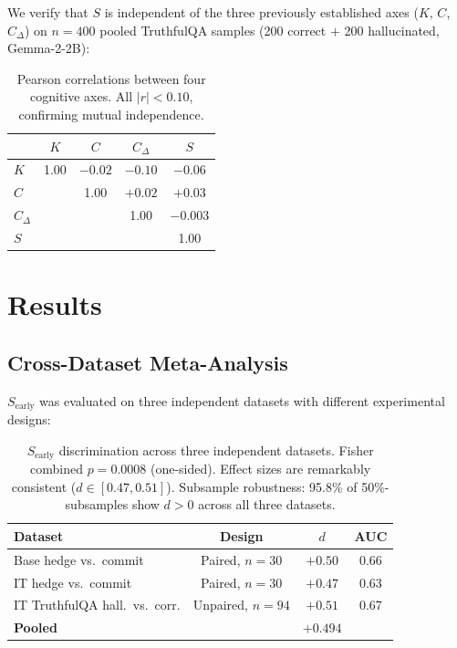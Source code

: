 \documentclass{article}
\begin{document}
We verify that $S$ is independent of the three previously established
axes ($K$, $C$, $C_\Delta$) on $n = 400$ pooled TruthfulQA samples
(200 correct $+$ 200 hallucinated, Gemma-2-2B):

\begin{table}[h]
\centering
\small
\begin{tabular}{lcccc}
\toprule
 & $K$ & $C$ & $C_\Delta$ & $S$ \\
\midrule
$K$ & 1.00 & $-0.02$ & $-0.10$ & $-0.06$ \\
$C$ &      & 1.00    & $+0.02$ & $+0.03$ \\
$C_\Delta$ & & & 1.00 & $-0.003$ \\
$S$ & & & & 1.00 \\
\bottomrule
\end{tabular}
\caption{Pearson correlations between four cognitive axes. All
$|r| < 0.10$, confirming mutual independence.}
\label{tab:orthogonality}
\end{table}

\section{Results}
\label{sec:results}

\subsection{Cross-Dataset Meta-Analysis}

$S_\text{early}$ was evaluated on three independent datasets with
different experimental designs:

\begin{table}[h]
\centering
\small
\begin{tabular}{lccc}
\toprule
Dataset & Design & $d$ & AUC \\
\midrule
Base hedge vs.\ commit & Paired, $n=30$ & $+0.50$ & 0.66 \\
IT hedge vs.\ commit & Paired, $n=30$ & $+0.47$ & 0.63 \\
IT TruthfulQA hall.\ vs.\ corr. & Unpaired, $n=94$ & $+0.51$ & 0.67 \\
\midrule
\textbf{Pooled} & & \textbf{$+0.494$} & \\
\bottomrule
\end{tabular}
\caption{$S_\text{early}$ discrimination across three independent
datasets. Fisher combined $p = 0.0008$ (one-sided). Effect sizes
are remarkably consistent ($d \in [0.47, 0.51]$). Subsample robustness:
95.8\% of 50\%-subsamples show $d > 0$ across all three datasets.}
\label{tab:meta}
\end{table}
\end{document}
